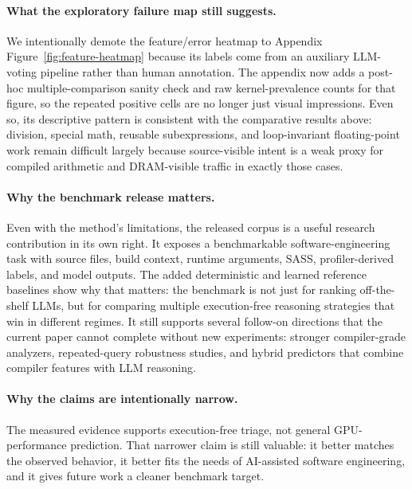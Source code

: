 \paragraph{What the exploratory failure map still suggests.}
We intentionally demote the feature/error heatmap to Appendix Figure~\ref{fig:feature-heatmap} because its labels come from an auxiliary LLM-voting pipeline rather than human annotation.
The appendix now adds a post-hoc multiple-comparison sanity check and raw kernel-prevalence counts for that figure, so the repeated positive cells are no longer just visual impressions.
Even so, its descriptive pattern is consistent with the comparative results above:
division, special math, reusable subexpressions, and loop-invariant floating-point work remain difficult largely because source-visible intent is a weak proxy for compiled arithmetic and DRAM-visible traffic in exactly those cases.

\paragraph{Why the benchmark release matters.}
Even with the method's limitations, the released corpus is a useful research contribution in its own right.
It exposes a benchmarkable software-engineering task with source files, build context, runtime arguments, SASS, profiler-derived labels, and model outputs.
The added deterministic and learned reference baselines show why that matters:
the benchmark is not just for ranking off-the-shelf LLMs, but for comparing multiple execution-free reasoning strategies that win in different regimes.
It still supports several follow-on directions that the current paper cannot complete without new experiments: stronger compiler-grade analyzers, repeated-query robustness studies, and hybrid predictors that combine compiler features with LLM reasoning.

\paragraph{Why the claims are intentionally narrow.}
The measured evidence supports execution-free triage, not general GPU-performance prediction.
That narrower claim is still valuable: it better matches the observed behavior, it better fits the needs of AI-assisted software engineering, and it gives future work a cleaner benchmark target.
